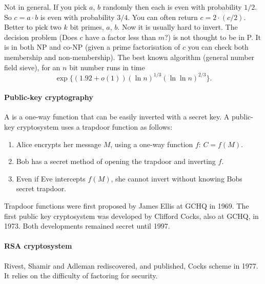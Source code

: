 \documentclass[a4paper, 11pt, openany]{book}
\begin{document}
Not in general. If you pick $a$, $b$ randomly then each is even with probability $1/2$. So $c = a \cdot b$ is even with probability $3/4$. You can often return $c = 2 \cdot (c/2)$.
Better to pick two $k$ bit primes, $a$, $b$. Now it is usually hard to invert.
The decision problem (Does $c$ have a factor less than $m$?) is not thought to be in P. It is in both NP and co-NP (given a prime factorisation of $c$ you can check both membership and non-membership). The best known algorithm (general number field sieve), for an $n$ bit number runs in time
\[
    \exp \{ (1.92 + o(1)) (\ln n)^{1/3} (\ln \ln n)^{2/3} \}.
\]





\paragraph{Public-key cryptography}
A  is a one-way function that can be easily inverted with a secret key. A public-key cryptosystem uses a trapdoor function as follows:
\begin{enumerate}
    \item Alice encrypts her message $M$, using a one-way function $f$: $C = f(M)$.

    \item Bob has a secret method of opening the trapdoor and inverting $f$.

    \item Even if Eve intercepts $f(M)$, she cannot invert without knowing Bobs secret trapdoor.
\end{enumerate}
Trapdoor functions were first proposed by James Ellis at GCHQ in 1969. The first public key cryptosystem was developed by Clifford Cocks, also at GCHQ, in 1973. Both developments remained secret until 1997.



\paragraph{RSA cryptosystem}
Rivest, Shamir and Adleman rediscovered, and published, Cocks scheme in 1977.
It relies on the difficulty of factoring for security.
\end{document}
